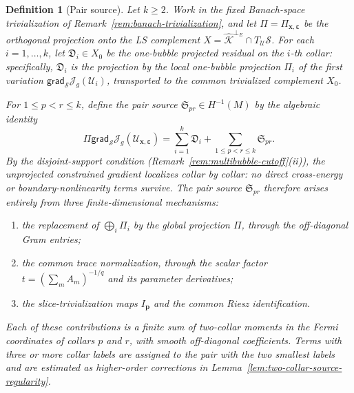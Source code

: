 \documentclass[11pt,reqno,a4paper]{amsart}
\numberwithin{equation}{section}
\theoremstyle{plain}
\newtheorem{definition}[theorem]{Definition}
\theoremstyle{remark}
\theoremstyle{plain}
\begin{document}
\begin{definition}[Pair source]\label{def:pair-source}
Let $k\ge2$.  Work in the fixed Banach-space trivialization of
Remark~\ref{rem:banach-trivialization}, and let
$\Pi=\Pi_{\mathbf x,\boldsymbol\varepsilon}$ be the orthogonal projection onto
the LS complement
$X=\widehat{\mathcal K}^{\perp_E}\cap T_{\mathcal U}\mathcal S$.
For each $i=1,\dots,k$, let $\mathfrak D_i\in X_0$ be the one-bubble projected
residual on the $i$-th collar: specifically, $\mathfrak D_i$ is the projection by
the local one-bubble projection $\Pi_i$ of the first variation
$\mathsf{grad}_{\mathcal S}\mathcal J_g(\mathcal U_i)$, transported to the common
trivialized complement $X_0$.

For $1\le p<r\le k$, define the \emph{pair source}
$\mathfrak S_{pr}\in H^{-1}(M)$ by the algebraic identity
\begin{equation}\label{eq:pair-source-definition}
\Pi\mathsf{grad}_{\mathcal S}
\mathcal J_g(\mathcal U_{\mathbf x,\boldsymbol\varepsilon})
=
\sum_{i=1}^k\mathfrak D_i
+
\sum_{1\le p<r\le k}\mathfrak S_{pr}.
\end{equation}
By the disjoint-support condition
(Remark~\ref{rem:multibubble-cutoff}\textup{(ii)}), the unprojected constrained
gradient localizes collar by collar: no direct cross-energy or
boundary-nonlinearity terms survive.  The pair source $\mathfrak S_{pr}$ therefore
arises entirely from three finite-dimensional mechanisms:
\begin{enumerate}[label=\textup{(\roman*)},leftmargin=1.5em]
\item the replacement of $\bigoplus_i\Pi_i$ by the global projection $\Pi$,
through the off-diagonal Gram entries;
\item the common trace normalization, through the scalar factor
$t=(\sum_m A_m)^{-1/q}$ and its parameter derivatives;
\item the slice-trivialization maps $I_{\mathbf p}$ and the common Riesz
identification.
\end{enumerate}
Each of these contributions is a finite sum of two-collar moments in the Fermi
coordinates of collars $p$ and $r$, with smooth off-diagonal coefficients.  Terms
with three or more collar labels are assigned to the pair with the two smallest
labels and are estimated as higher-order corrections in
Lemma~\ref{lem:two-collar-source-regularity}.
\end{definition}
\end{document}
